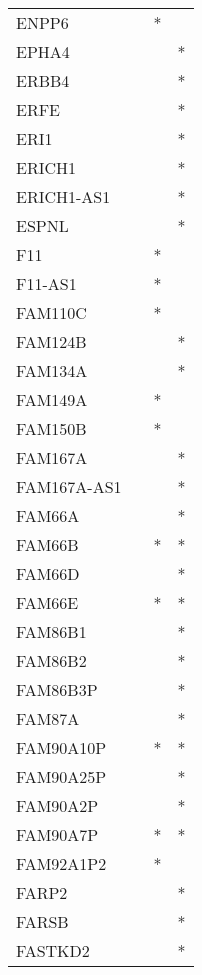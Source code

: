 \begin{longtable}{lccc}
ENPP6          &       &  * &         \\
EPHA4          &       &    &       * \\
ERBB4          &       &    &       * \\
ERFE           &       &    &       * \\
ERI1           &       &    &       * \\
ERICH1         &       &    &       * \\
ERICH1-AS1     &       &    &       * \\
ESPNL          &       &    &       * \\
F11            &       &  * &         \\
F11-AS1        &       &  * &         \\
FAM110C        &       &  * &         \\
FAM124B        &       &    &       * \\
FAM134A        &       &    &       * \\
FAM149A        &       &  * &         \\
FAM150B        &       &  * &         \\
FAM167A        &       &    &       * \\
FAM167A-AS1    &       &    &       * \\
FAM66A         &       &    &       * \\
FAM66B         &       &  * &       * \\
FAM66D         &       &    &       * \\
FAM66E         &       &  * &       * \\
FAM86B1        &       &    &       * \\
FAM86B2        &       &    &       * \\
FAM86B3P       &       &    &       * \\
FAM87A         &       &    &       * \\
FAM90A10P      &       &  * &       * \\
FAM90A25P      &       &    &       * \\
FAM90A2P       &       &    &       * \\
FAM90A7P       &       &  * &       * \\
FAM92A1P2      &       &  * &         \\
FARP2          &       &    &       * \\
FARSB          &       &    &       * \\
FASTKD2        &       &    &       * \\

\end{longtable}
